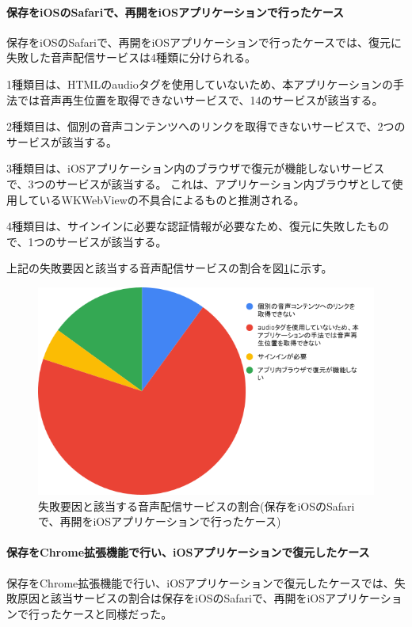 \paragraph{保存をiOSのSafariで、再開をiOSアプリケーションで行ったケース}
保存をiOSのSafariで、再開をiOSアプリケーションで行ったケースでは、復元に失敗した音声配信サービスは4種類に分けられる。

1種類目は、HTMLのaudioタグを使用していないため、本アプリケーションの手法では音声再生位置を取得できないサービスで、14のサービスが該当する。

2種類目は、個別の音声コンテンツへのリンクを取得できないサービスで、2つのサービスが該当する。

3種類目は、iOSアプリケーション内のブラウザで復元が機能しないサービスで、3つのサービスが該当する。
これは、アプリケーション内ブラウザとして使用しているWKWebViewの不具合によるものと推測される。

4種類目は、サインインに必要な認証情報が必要なため、復元に失敗したもので、1つのサービスが該当する。

上記の失敗要因と該当する音声配信サービスの割合を図\ref{fig:evl-consideration-audio-cause-ratio-ios}に示す。

\begin{figure}[htbp]
  \caption{失敗要因と該当する音声配信サービスの割合(保存をiOSのSafariで、再開をiOSアプリケーションで行ったケース)}
  \label{fig:evl-consideration-audio-cause-ratio-ios}
  \begin{center}
    \includegraphics[bb=0 0 600 371,width=15cm]{img/060_evaluation/consideration/audio/cause-ratio-ios.pdf}
  \end{center}
\end{figure}

\paragraph{保存をChrome拡張機能で行い、iOSアプリケーションで復元したケース}
保存をChrome拡張機能で行い、iOSアプリケーションで復元したケースでは、失敗原因と該当サービスの割合は保存をiOSのSafariで、再開をiOSアプリケーションで行ったケースと同様だった。

